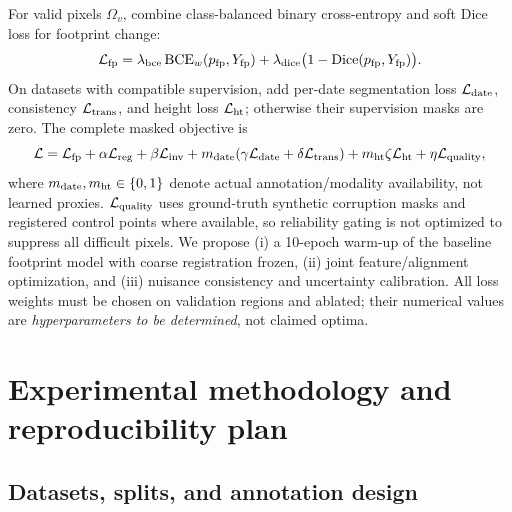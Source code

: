 \documentclass[11pt,a4paper]{article}
\begin{document}
For valid pixels $\Omega_v$, combine class-balanced binary cross-entropy and soft Dice loss for footprint change:
\begin{equation}
 {\cal L}_{\rm fp}=\lambda_{\rm bce}\,{\rm BCE}_w(p_{\rm fp},Y_{\rm fp})
  +\lambda_{\rm dice}\big(1-\operatorname{Dice}(p_{\rm fp},Y_{\rm fp})\big).
 \label{eq:footloss}
\end{equation}
On datasets with compatible supervision, add per-date segmentation loss $\mathcal L_{\rm date}$, consistency $\mathcal L_{\rm trans}$, and height loss $\mathcal L_{\rm ht}$; otherwise their supervision masks are zero. The complete masked objective is
\begin{equation}
 \mathcal L=\mathcal L_{\rm fp}+\alpha\mathcal L_{\rm reg}
 +\beta\mathcal L_{\rm inv}+m_{\rm date}(\gamma\mathcal L_{\rm date}+\delta\mathcal L_{\rm trans})
 +m_{\rm ht}\zeta\mathcal L_{\rm ht}+\eta\mathcal L_{\rm quality},
 \label{eq:total}
\end{equation}
where $m_{\rm date},m_{\rm ht}\in\{0,1\}$ denote actual annotation/modality availability, not learned proxies. $\mathcal L_{\rm quality}$ uses ground-truth synthetic corruption masks and registered control points where available, so reliability gating is not optimized to suppress all difficult pixels. We propose (i) a 10-epoch warm-up of the baseline footprint model with coarse registration frozen, (ii) joint feature/alignment optimization, and (iii) nuisance consistency and uncertainty calibration. All loss weights must be chosen on validation regions and ablated; their numerical values are \emph{hyperparameters to be determined}, not claimed optima.

\section{Experimental methodology and reproducibility plan}
\label{sec:experiment}

\subsection{Datasets, splits, and annotation design}
\end{document}
